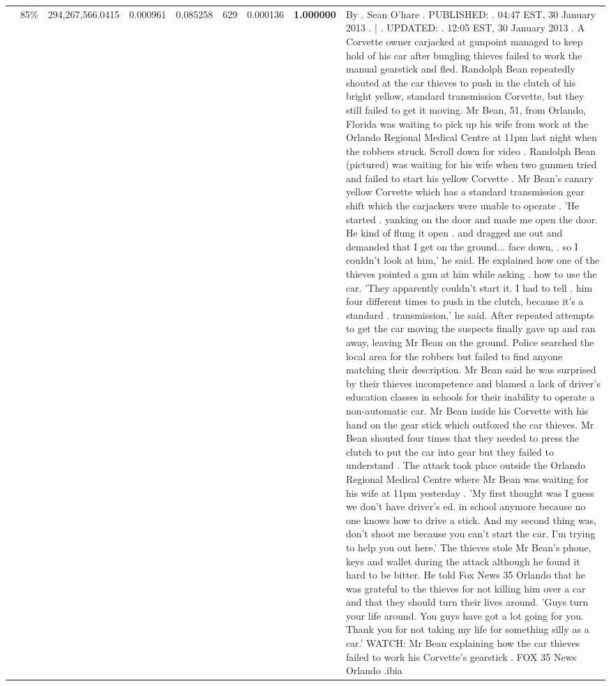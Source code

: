 \begin{table}[H]
\begin{tabular}{llrrrrrrl}
 & 85\% & 294,267,566.0415 & 0.000961 & 0.085258 & \color{red} 629 & 0.000136 & \bfseries \color{red} 1.000000 & By . Sean O'hare . PUBLISHED: . 04:47 EST, 30 January 2013 . | . UPDATED: . 12:05 EST, 30 January 2013 . A Corvette owner carjacked at gunpoint managed to keep hold of his car after bungling thieves failed to work the manual gearstick and fled. Randolph Bean repeatedly shouted at the car thieves to push in the clutch of his bright yellow, standard transmission Corvette, but they still failed to get it moving. Mr Bean, 51, from Orlando, Florida was waiting to pick up his wife from work at the Orlando Regional Medical Centre at 11pm last night when the robbers struck. Scroll down for video . Randolph Bean (pictured) was waiting for his wife when two gunmen tried and failed to start his yellow Corvette . Mr Bean's canary yellow Corvette which has a standard transmission gear shift which the carjackers were unable to operate . 'He started . yanking on the door and made me open the door. He kind of flung it open . and dragged me out and demanded that I get on the ground... face down, . so I couldn't look at him,' he said. He explained how one of the thieves pointed a gun at him while asking . how to use the car. 'They apparently couldn't start it. I had to tell . him four different times to push in the clutch, because it's a standard . transmission,' he said. After repeated attempts to get the car moving the suspects finally gave up and ran away, leaving Mr Bean on the ground. Police searched the local area for the robbers but failed to find anyone matching their description. Mr Bean said he was surprised by their thieves incompetence and blamed a lack of driver's education classes in schools for their inability to operate a non-automatic car. Mr Bean inside his Corvette with his hand on the gear stick which outfoxed the car thieves. Mr Bean shouted four times that they needed to press the clutch to put the car into gear but they failed to understand . The attack took place outside the Orlando Regional Medical Centre where Mr Bean was waiting for his wife at 11pm yesterday . 'My first thought was I guess we don't have driver's ed. in school anymore because no one knows how to drive a stick. And my second thing was, don't shoot me because you can't start the car. I'm trying to help you out here.' The thieves stole Mr Bean's phone, keys and wallet during the attack although he found it hard to be bitter. He told Fox News 35 Orlando that he was grateful to the thieves for not killing him over a car and that they should turn their lives around. 'Guys turn your life around. You guys have got a lot going for you. Thank you for not taking my life for something silly as a car.' WATCH: Mr Bean explaining how the car thieves failed to work his Corvette's gearstick . FOX 35 News Orlando .ibia \\

\end{tabular}
\end{table}

